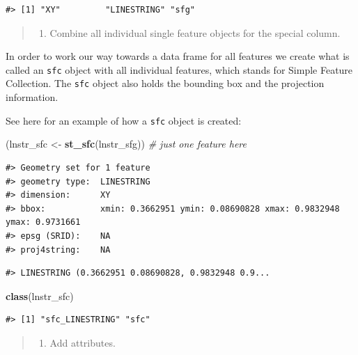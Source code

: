 \documentclass[]{book}
\newenvironment{Shaded}{\begin{snugshade}}{\end{snugshade}}
\newcommand{\KeywordTok}[1]{\textcolor[rgb]{0.13,0.29,0.53}{\textbf{#1}}}
\newcommand{\StringTok}[1]{\textcolor[rgb]{0.31,0.60,0.02}{#1}}
\newcommand{\CommentTok}[1]{\textcolor[rgb]{0.56,0.35,0.01}{\textit{#1}}}
\newcommand{\NormalTok}[1]{#1}
\providecommand{\tightlist}{%
  \setlength{\itemsep}{0pt}\setlength{\parskip}{0pt}}
\theoremstyle{definition}
\theoremstyle{definition}
\theoremstyle{definition}
\theoremstyle{remark}
\begin{document}
\begin{verbatim}
#> [1] "XY"         "LINESTRING" "sfg"
\end{verbatim}

\begin{quote}
\begin{enumerate}
\def\labelenumi{\Roman{enumi}.}
\setcounter{enumi}{1}
\tightlist
\item
  Combine all individual single feature objects for the special column.
\end{enumerate}
\end{quote}

In order to work our way towards a data frame for all features we create
what is called an \texttt{sfc} object with all individual features,
which stands for Simple Feature Collection. The \texttt{sfc} object also
holds the bounding box and the projection information.

See here for an example of how a \texttt{sfc} object is created:

\begin{Shaded}
\begin{Highlighting}[]
\NormalTok{(lnstr_sfc <-}\StringTok{ }\KeywordTok{st_sfc}\NormalTok{(lnstr_sfg)) }\CommentTok{# just one feature here}
\end{Highlighting}
\end{Shaded}

\begin{verbatim}
#> Geometry set for 1 feature 
#> geometry type:  LINESTRING
#> dimension:      XY
#> bbox:           xmin: 0.3662951 ymin: 0.08690828 xmax: 0.9832948 ymax: 0.9731661
#> epsg (SRID):    NA
#> proj4string:    NA
\end{verbatim}

\begin{verbatim}
#> LINESTRING (0.3662951 0.08690828, 0.9832948 0.9...
\end{verbatim}

\begin{Shaded}
\begin{Highlighting}[]
\KeywordTok{class}\NormalTok{(lnstr_sfc) }
\end{Highlighting}
\end{Shaded}

\begin{verbatim}
#> [1] "sfc_LINESTRING" "sfc"
\end{verbatim}

\begin{quote}
\begin{enumerate}
\def\labelenumi{\Roman{enumi}.}
\setcounter{enumi}{2}
\tightlist
\item
  Add attributes.
\end{enumerate}
\end{quote}
\end{document}

